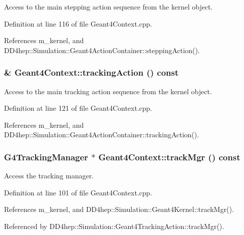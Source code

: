 Access to the main stepping action sequence from the kernel object. 

Definition at line 116 of file Geant4Context.cpp.

References m\_\-kernel, and DD4hep::Simulation::Geant4ActionContainer::steppingAction().\hypertarget{class_d_d4hep_1_1_simulation_1_1_geant4_context_a7138521b243570946a8b0cecd60d1b81}{
\subsubsection[{trackingAction}]{ \& Geant4Context::trackingAction () const}}
\label{class_d_d4hep_1_1_simulation_1_1_geant4_context_a7138521b243570946a8b0cecd60d1b81}


Access to the main tracking action sequence from the kernel object. 

Definition at line 121 of file Geant4Context.cpp.

References m\_\-kernel, and DD4hep::Simulation::Geant4ActionContainer::trackingAction().\hypertarget{class_d_d4hep_1_1_simulation_1_1_geant4_context_af3961d95f8680484d4f2a0fbc1186741}{
\subsubsection[{trackMgr}]{\setlength{\rightskip}{0pt plus 5cm}G4TrackingManager $\ast$ Geant4Context::trackMgr () const}}
\label{class_d_d4hep_1_1_simulation_1_1_geant4_context_af3961d95f8680484d4f2a0fbc1186741}


Access the tracking manager. 

Definition at line 101 of file Geant4Context.cpp.

References m\_\-kernel, and DD4hep::Simulation::Geant4Kernel::trackMgr().

Referenced by DD4hep::Simulation::Geant4TrackingAction::trackMgr().

